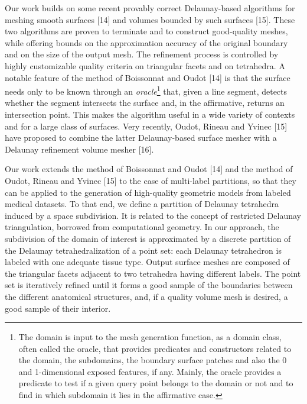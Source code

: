 {Our work builds on some recent provably correct Delaunay-based algorithms for meshing smooth surfaces [14] and volumes bounded by such surfaces [15]. These two algorithms are proven to terminate and to construct good-quality meshes, while offering bounds on the approximation accuracy of the original boundary and on the size of the output mesh. The refinement process is controlled by highly customizable quality criteria on triangular facets and on tetrahedra. A notable feature of the method of Boissonnat and Oudot [14] is that the surface needs only to be known through an {\it oracle}\footnote{The domain is input to the mesh generation function, as a domain class, often called the oracle, that provides predicates and constructors related to the domain, the subdomains, the boundary surface patches and also the 0 and 1-dimensional exposed features, if any. Mainly, the oracle provides a predicate to test if a given query point belongs to the domain or not and to find in which subdomain it lies in the affirmative case.} that, given a line segment, detects whether the segment intersects the surface and, in the affirmative, returns an intersection point. This makes the algorithm useful in a wide variety of contexts and for a large class of surfaces. Very recently, Oudot, Rineau and Yvinec [15] have proposed to combine the latter Delaunay-based surface mesher with a Delaunay refinement volume mesher [16].

Our work extends the method of Boissonnat and Oudot [14] and the method of Oudot, Rineau and Yvinec [15] to the case of multi-label partitions, so that they can be applied to the generation of high-quality geometric models from labeled medical datasets. To that end, we define a partition of Delaunay tetrahedra induced by a space subdivision. It is related to the concept of restricted Delaunay triangulation, borrowed from computational geometry. In our approach, the subdivision of the domain of interest is approximated by a discrete partition of the Delaunay tetrahedralization of a point set: each Delaunay tetrahedron is labeled with one adequate tissue type. Output surface meshes are composed of the triangular facets adjacent to two tetrahedra having different labels. The point set is iteratively refined until it forms a good sample of the boundaries between the different anatomical structures, and, if a quality volume mesh is desired, a good sample of their interior.

}
